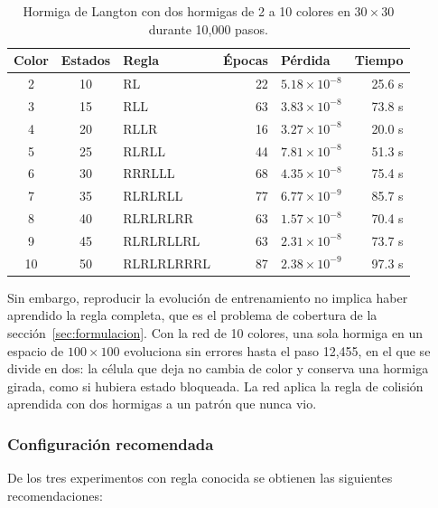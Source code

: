 \begin{table}[!t]
	\centering
	\footnotesize
	\setlength{\tabcolsep}{4pt}
	\begin{tabular}{@{}ccl@{}rl@{}r@{}}
		\toprule
		\textbf{Color} & \textbf{Estados} & \textbf{Regla} & \textbf{Épocas} & \textbf{Pérdida} & \textbf{Tiempo} \\
		\midrule
		2 & 10 & RL & 22 & $5.18\times10^{-8}$ & 25.6 s \\
		3 & 15 & RLL & 63 & $3.83\times10^{-8}$ & 73.8 s \\
		4 & 20 & RLLR & 16 & $3.27\times10^{-8}$ & 20.0 s \\
		5 & 25 & RLRLL & 44 & $7.81\times10^{-8}$ & 51.3 s \\
		6 & 30 & RRRLLL & 68 & $4.35\times10^{-8}$ & 75.4 s \\
		7 & 35 & RLRLRLL & 77 & $6.77\times10^{-9}$ & 85.7 s \\
		8 & 40 & RLRLRLRR & 63 & $1.57\times10^{-8}$ & 70.4 s \\
		9 & 45 & RLRLRLLRL & 63 & $2.31\times10^{-8}$ & 73.7 s \\
		10 & 50 & RLRLRLRRRL & 87 & $2.38\times10^{-9}$ & 97.3 s \\
		\bottomrule
	\end{tabular}
	\caption{Hormiga de Langton con dos hormigas de 2 a 10 colores en $30\times30$ durante 10,000 pasos.}
	\label{tab:langton_colores}
\end{table}

Sin embargo, reproducir la evolución de entrenamiento no implica haber aprendido la regla completa, que es el problema de cobertura de la sección~\ref{sec:formulacion}. Con la red de 10 colores, una sola hormiga en un espacio de $100\times100$ evoluciona sin errores hasta el paso 12,455, en el que se divide en dos: la célula que deja no cambia de color y conserva una hormiga girada, como si hubiera estado bloqueada. La red aplica la regla de colisión aprendida con dos hormigas a un patrón que nunca vio.

\subsubsection{Configuración recomendada}
De los tres experimentos con regla conocida se obtienen las siguientes recomendaciones:

